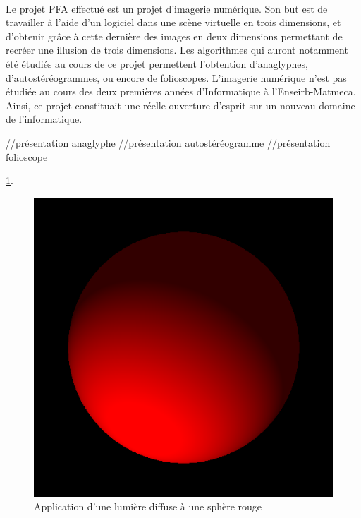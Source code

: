 \paragraph{}
        Le projet PFA effectué est un projet d'imagerie numérique. Son but est de travailler à l'aide d'un logiciel dans une scène virtuelle en trois dimensions, et d'obtenir grâce à cette dernière des images en deux dimensions permettant de recréer une illusion de trois dimensions. Les algorithmes qui auront notamment été étudiés au cours de ce projet permettent l'obtention d'anaglyphes, d'autostéréogrammes, ou encore de folioscopes.
        L'imagerie numérique n'est pas étudiée au cours des deux premières années d'Informatique à l'Enseirb-Matmeca. Ainsi, ce projet constituait une réelle ouverture d'esprit sur un nouveau domaine de l'informatique.
        

//présentation anaglyphe
//présentation autostéréogramme
//présentation folioscope




\ref{fig:sphère}.

\begin{figure}[h]
	\centering
	\includegraphics[scale=0.3]{boule.png}
	\caption{\label{fig:sphère} Application d’une lumière diffuse à une sphère rouge \protect \footnotemark }
\end{figure}

